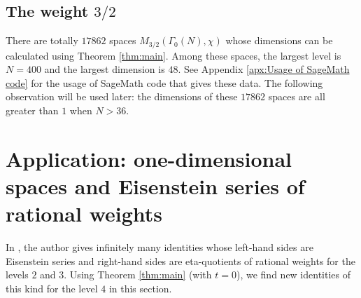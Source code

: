 \documentclass[12pt]{amsart}
\numberwithin{equation}{section}
\theoremstyle{plain}
\theoremstyle{definition}
\theoremstyle{remark}
\newcommand\legendre[2]{\genfrac{(}{)}{}{}{#1}{#2}}
\newcommand\numZ{\mathbb{Z}}
\begin{document}



\subsection{The weight $3/2$}
\label{subsec:wt3/2}
There are totally $17862$ spaces $M_{3/2}(\Gamma_0(N),\chi)$ whose dimensions can be calculated using Theorem \ref{thm:main}. Among these spaces, the largest level is $N=400$ and the largest dimension is $48$. See Appendix \ref{apx:Usage of SageMath code} for the usage of SageMath code that gives these data. The following observation will be used later: the dimensions of these $17862$ spaces are all greater than $1$ when $N>36$.


\section{Application: one-dimensional spaces and Eisenstein series of rational weights}
\label{sec:one-dimensional spaces and Eisenstein series of rational weights}
In \cite[Section 7]{Zhu23}, the author gives infinitely many identities whose left-hand sides are Eisenstein series and right-hand sides are eta-quotients of rational weights for the levels $2$ and $3$. Using Theorem \ref{thm:main} (with $t=0$), we find new identities of this kind for the level $4$ in this section.
\end{document}
